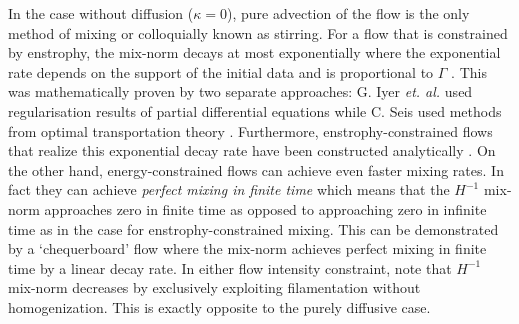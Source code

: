 \documentclass[12pt]{iopart}
\newcommand{\ltwo}[1]{\|#1\|_{L^{2}}}
\renewcommand{\vec}[1]{\mathbf{#1}}
\begin{document}

In the case without diffusion ($\kappa = 0$), pure advection of the flow is the only method of mixing or colloquially known as stirring. For a flow that is constrained by enstrophy, the mix-norm decays at most exponentially where the exponential rate depends on the support of the initial data and is proportional to $\Gamma$ \cite{GI2014,CS2013}. This was mathematically proven by two separate approaches: G. Iyer {\it et. al.} \cite{GI2014} used regularisation results of partial differential equations \cite{Crippa} while C. Seis \cite{CS2013} used methods from optimal transportation theory \cite{villani2003topics}. Furthermore, enstrophy-constrained flows that realize this exponential decay rate have been constructed analytically \cite{Alberti2014a}. On the other hand, energy-constrained flows can achieve even faster mixing rates. In fact they can achieve {\it perfect mixing in finite time} which means that the $H^{-1}$ mix-norm approaches zero in finite time as opposed to approaching zero in infinite time as in the case for enstrophy-constrained mixing. This can be demonstrated by a `chequerboard' flow \cite{JMP2012} where the mix-norm achieves perfect mixing in finite time by a linear decay rate.  In either flow intensity constraint, note that $H^{-1}$ mix-norm decreases by exclusively exploiting filamentation without homogenization. This is  exactly opposite to the purely diffusive case.
\end{document}
